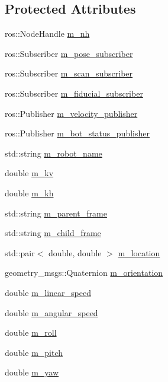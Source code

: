 \subsection*{Protected Attributes}
\begin{DoxyCompactItemize}
\item 
ros\+::\+Node\+Handle \hyperlink{class_bot___controller_a8c1fd43eb1f1b2443c29e29c154e6bbf}{m\+\_\+nh}
\item 
ros\+::\+Subscriber \hyperlink{class_bot___controller_a20ae2e16fa667a6814200b2fa625560d}{m\+\_\+pose\+\_\+subscriber}
\item 
ros\+::\+Subscriber \hyperlink{class_bot___controller_a6e51618eccaa742f901c524960f828d9}{m\+\_\+scan\+\_\+subscriber}
\item 
ros\+::\+Subscriber \hyperlink{class_bot___controller_a198f7fa6e2c06473b50b6f63a052d80d}{m\+\_\+fiducial\+\_\+subscriber}
\item 
ros\+::\+Publisher \hyperlink{class_bot___controller_a4ffa549048f2deb56585dccb829bc799}{m\+\_\+velocity\+\_\+publisher}
\item 
ros\+::\+Publisher \hyperlink{class_bot___controller_a7ecd942ad3fc0ae744d95fc412e0eeef}{m\+\_\+bot\+\_\+status\+\_\+publisher}
\item 
std\+::string \hyperlink{class_bot___controller_ae7b886cbf176bf26f2b79ff3b9c2b2d3}{m\+\_\+robot\+\_\+name}
\item 
double \hyperlink{class_bot___controller_a3a32a48f880085309d6a4cf97b00d782}{m\+\_\+kv}
\item 
double \hyperlink{class_bot___controller_a370bd365935d7a3974bb3e4cb1c03527}{m\+\_\+kh}
\item 
std\+::string \hyperlink{class_bot___controller_a9bab0d5444e03781994c77b1416b2bc3}{m\+\_\+parent\+\_\+frame}
\item 
std\+::string \hyperlink{class_bot___controller_acc69b7362125c7dac732900685487fa0}{m\+\_\+child\+\_\+frame}
\item 
std\+::pair$<$ double, double $>$ \hyperlink{class_bot___controller_a0263fb2e87730711a87b601a92cbfb1b}{m\+\_\+location}
\item 
geometry\+\_\+msgs\+::\+Quaternion \hyperlink{class_bot___controller_a89d0e2f520820806f17b7019e34c2878}{m\+\_\+orientation}
\item 
double \hyperlink{class_bot___controller_a00d57b54c76e9ca0eb977f0e844183ef}{m\+\_\+linear\+\_\+speed}
\item 
double \hyperlink{class_bot___controller_ac5261f99cc940016fe9ce6c565fa5d7c}{m\+\_\+angular\+\_\+speed}
\item 
double \hyperlink{class_bot___controller_a6326d31a11e7af0bfb6d25c6d5810aad}{m\+\_\+roll}
\item 
double \hyperlink{class_bot___controller_a72b91ce22685011b90339b627b7dc4f3}{m\+\_\+pitch}
\item 
double \hyperlink{class_bot___controller_a86f4b79640605ce24d6ced079bb61d46}{m\+\_\+yaw}
\end{DoxyCompactItemize}


